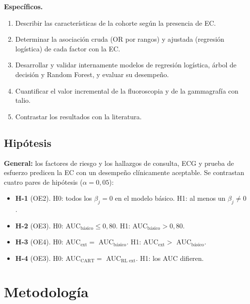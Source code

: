 \documentclass[twocolumn,10pt]{article}
\begin{document}
\textbf{Espec\'ificos.}
\begin{enumerate}
\item[OE1.] Describir las caracter\'isticas de la cohorte seg\'un la presencia de EC.
\item[OE2.] Determinar la asociaci\'on cruda (OR por rangos) y ajustada (regresi\'on log\'istica) de cada factor con la EC.
\item[OE3.] Desarrollar y validar internamente modelos de regresi\'on log\'istica, \'arbol de decisi\'on y Random Forest, y evaluar su desempe\~no.
\item[OE4.] Cuantificar el valor incremental de la fluoroscopia y de la gammagraf\'ia con talio.
\item[OE5.] Contrastar los resultados con la literatura.
\end{enumerate}

\subsection{Hip\'otesis}
\textbf{General:} los factores de riesgo y los hallazgos de consulta, ECG y prueba de esfuerzo predicen la EC con un desempe\~no cl\'inicamente aceptable. Se contrastan cuatro pares de hip\'otesis ($\alpha=0{,}05$):
\begin{itemize}
\item \textbf{H-1} (OE2). H0: todos los $\beta_j=0$ en el modelo b\'asico. H1: al menos un $\beta_j\neq0$.
\item \textbf{H-2} (OE3). H0: AUC$_{\text{b\'asico}}\leq0{,}80$. H1: AUC$_{\text{b\'asico}}>0{,}80$.
\item \textbf{H-3} (OE4). H0: AUC$_{\text{ext}}=$ AUC$_{\text{b\'asico}}$. H1: AUC$_{\text{ext}}>$ AUC$_{\text{b\'asico}}$.
\item \textbf{H-4} (OE3). H0: AUC$_{\text{CART}}=$ AUC$_{\text{RL ext}}$. H1: los AUC difieren.
\end{itemize}

\section{Metodolog\'ia}
\end{document}
